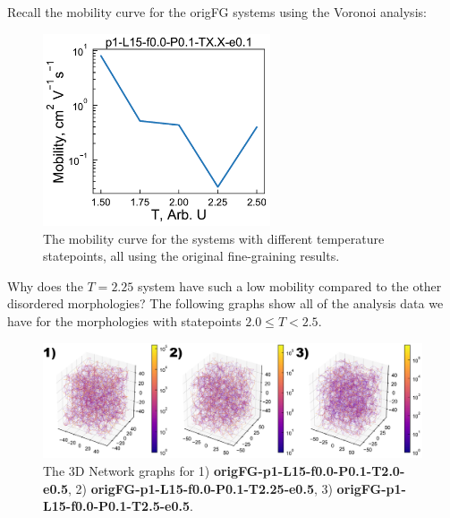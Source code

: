 \documentclass[12pt]{article}
\begin{document}
Recall the mobility curve for the origFG systems using the Voronoi analysis:


\begin{figure}[h!]\centering
	\includegraphics[width=0.6\textwidth]{Figures/origFGTempMob.pdf}
    \caption{The mobility curve for the systems with different temperature statepoints, all using the original fine-graining results.}
	\label{fig:Mob}
\end{figure}


Why does the $T = 2.25$ system have such a low mobility compared to the other disordered morphologies?
The following graphs show all of the analysis data we have for the morphologies with statepoints $2.0 \leq T < 2.5$.

\begin{figure}[hb]\centering
	\includegraphics[width=\textwidth]{Figures/networks.png}
    \caption{The 3D Network graphs for 1) \textbf{origFG-p1-L15-f0.0-P0.1-T2.0-e0.5}, 2) \textbf{origFG-p1-L15-f0.0-P0.1-T2.25-e0.5}, 3) \textbf{origFG-p1-L15-f0.0-P0.1-T2.5-e0.5}.}
	\label{fig:net}
\end{figure}
\end{document}
